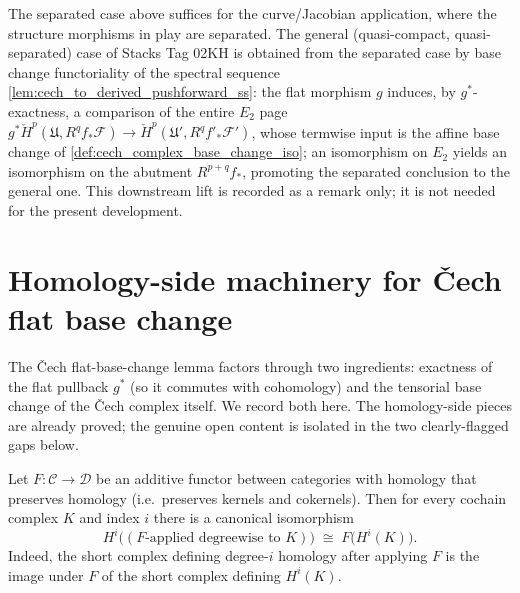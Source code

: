 \begin{remark}
  \label{rem:cech_flat_base_change_general}
  The separated case above suffices for the curve/Jacobian application, where the
  structure morphisms in play are separated. The general (quasi-compact,
  quasi-separated) case of Stacks Tag 02KH is obtained from the separated case by base
  change functoriality of the spectral sequence
  \cref{lem:cech_to_derived_pushforward_ss}: the flat morphism \(g\) induces, by
  \(g^*\)-exactness, a comparison of the entire \(E_2\) page
  \(g^*\check{H}^p(\mathfrak{U}, R^q f_*\mathcal{F}) \to
  \check{H}^p(\mathfrak{U}', R^q f'_*\mathcal{F}')\), whose termwise input is the affine
  base change of \cref{def:cech_complex_base_change_iso}; an isomorphism on \(E_2\)
  yields an isomorphism on the abutment \(R^{p+q} f_*\), promoting the separated
  conclusion to the general one. This downstream lift is recorded as a remark only; it
  is not needed for the present development.
\end{remark}

\section{Homology-side machinery for {\v C}ech flat base change}

The {\v C}ech flat-base-change lemma factors through two ingredients: exactness of the
flat pullback \(g^*\) (so it commutes with cohomology) and the tensorial base change of
the {\v C}ech complex itself. We record both here. The homology-side pieces are
already proved; the genuine open content is isolated in the two clearly-flagged gaps below.

\begin{lemma}\leanok
  \label{lem:map_hc_homology_iso}
  Let \(F : \mathcal{C} \to \mathcal{D}\) be an additive functor between categories
  with homology that preserves homology (i.e.\ preserves kernels and cokernels). Then
  for every cochain complex \(K\) and index \(i\) there is a canonical isomorphism
  \[
    H^i\bigl((F\text{-applied degreewise to } K)\bigr) \;\cong\; F\bigl(H^i(K)\bigr).
  \]
  Indeed, the short complex defining degree-\(i\) homology after applying \(F\) is the
  image under \(F\) of the short complex defining \(H^i(K)\).
\end{lemma}

